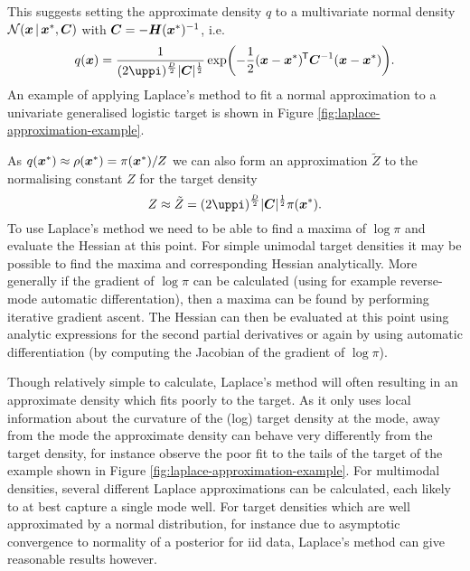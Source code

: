 This suggests setting the approximate density $q$ to a multivariate normal density $\nrm{\vct{x} \gvn \vct{x}^*,\mtx{C}}$ with $\boldsymbol{C} = -\boldsymbol{H}(\boldsymbol{x}^*)^{-1}$, i.e.
\begin{equation}\label{eq:laplace-approximation}
  q(\vct{x}) = 
  \frac{1}{(2\uppi)^{\frac{D}{2}}|\mtx{C}|^{\frac{1}{2}}} 
  \exp\lpa-\frac{1}{2}(\vct{x}-\vct{x}^*)\tr\mtx{C}^{-1}(\vct{x}-\vct{x}^*)\rpa.
\end{equation}
An example of applying Laplace's method to fit a normal approximation to a univariate generalised logistic target is shown in Figure \ref{fig:laplace-approximation-example}.

As $q(\boldsymbol{x}^*) \approx \rho(\boldsymbol{x}^*) = \pi(\boldsymbol{x}^*) / Z$ we can also form an approximation $\tilde{Z}$ to the normalising constant $Z$ for the target density
\begin{equation}\label{eq:laplace-approximation-normalising-const}
  Z \approx \tilde{Z} = (2\uppi)^{\frac{D}{2}} |\mtx{C}|^{\frac{1}{2}}\pi(\vct{x}^*).
\end{equation}
To use Laplace's method we need to be able to find a maxima of $\log\pi$ and evaluate the Hessian at this point. For simple unimodal target densities it may be possible to find the maxima and corresponding Hessian analytically. More generally if the gradient of $\log\pi$ can be calculated (using for example reverse-mode automatic differentation), then a maxima can be found by performing iterative gradient ascent. The Hessian can then be evaluated at this point using analytic expressions for the second partial derivatives or again by using automatic differentiation (by computing the Jacobian of the gradient of $\log\pi$).

Though relatively simple to calculate, Laplace's method will often resulting in an approximate density which fits poorly to the target. As it only uses local information about the curvature of the (log) target density at the mode, away from the mode the approximate density can behave very differently from the target density, for instance observe the poor fit to the tails of the target of the example shown in Figure \ref{fig:laplace-approximation-example}. For multimodal densities, several different Laplace approximations can be calculated, each likely to at best capture a single mode well. For target densities which are well approximated by a normal distribution, for instance due to asymptotic convergence to normality of a posterior for \ac{iid} data, Laplace's method can give reasonable results however. 

